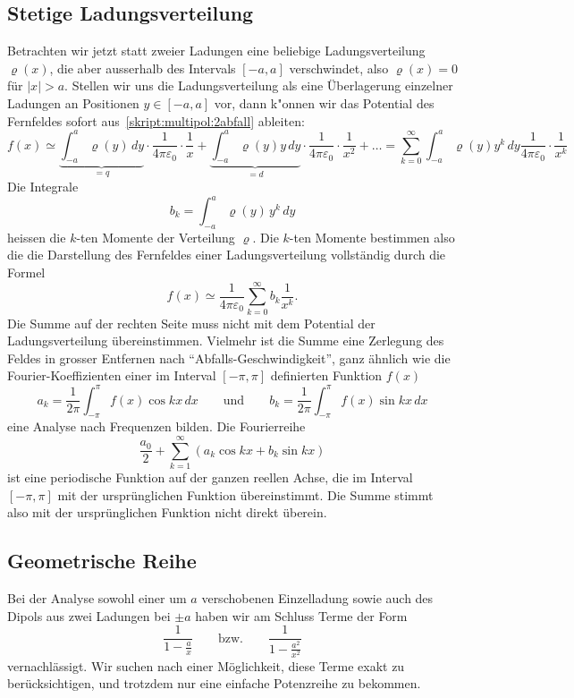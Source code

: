 \subsection{Stetige Ladungsverteilung%
\label{skript:multipol:section:stetigeladungsverteilung}}
Betrachten wir jetzt statt zweier Ladungen eine beliebige 
Ladungsverteilung $\varrho(x)$, die aber ausserhalb des Intervals
$[-a,a]$ verschwindet, also $\varrho(x)=0$ für $|x|>a$.
Stellen wir uns die Ladungsverteilung als eine Überlagerung einzelner
Ladungen an Positionen $y\in[-a,a]$ vor, dann k"onnen wir das
Potential des Fernfeldes sofort aus~\eqref{skript:multipol:2abfall}
ableiten:
\[
f(x)
\simeq
\underbrace{\int_{-a}^a \varrho(y)\,dy }_{\displaystyle =q}\cdot
\frac{1}{4\pi\varepsilon_0}\cdot\frac1x
+
\underbrace{\int_{-a}^a \varrho(y)y \,dy}_{\displaystyle =d}\cdot
\frac{1}{4\pi\varepsilon_0}\cdot\frac1{x^2}
+
\dots
=
\sum_{k=0}^\infty\int_{-a}^a\varrho(y)y^k\,dy\frac{1}{4\pi\varepsilon_0}\cdot\frac1{x^k} 
\]
Die Integrale 
\[
b_k=\int_{-a}^a \varrho(y)\,y^k\,dy
\]
heissen die $k$-ten Momente der Verteilung $\varrho$.
Die $k$-ten Momente bestimmen also die die Darstellung des Fernfeldes
einer Ladungsverteilung vollständig durch die Formel
\[
f(x)
\simeq
\frac1{4\pi\varepsilon_0}\sum_{k=0}^\infty b_k\frac{1}{x^k}.
\]
Die Summe auf der rechten Seite muss nicht mit dem Potential der
Ladungsverteilung übereinstimmen.
Vielmehr ist die Summe eine Zerlegung des Feldes in grosser Entfernen
nach ``Abfalls-Geschwindigkeit'',
ganz ähnlich wie die Fourier-Koeffizienten einer im Interval
$[-\pi,\pi]$ definierten Funktion $f(x)$
\[
a_k=\frac1{2\pi}\int_{-\pi}^\pi f(x)\cos kx\,dx
\qquad\text{und}\qquad
b_k=\frac1{2\pi}\int_{-\pi}^\pi f(x)\sin kx\,dx
\]
eine Analyse nach Frequenzen bilden.
Die Fourierreihe
\[
\frac{a_0}2+\sum_{k=1}^\infty (a_k\cos kx+b_k\sin kx)
\]
ist eine periodische Funktion auf der ganzen reellen Achse, die
im Interval $[-\pi,\pi]$ mit der ursprünglichen Funktion übereinstimmt.
Die Summe stimmt also mit der ursprünglichen Funktion nicht direkt
überein.

\subsection{Geometrische Reihe%
\label{skript:multipol:section:geometrischereihe}}
Bei der Analyse sowohl einer um $a$ verschobenen Einzelladung sowie auch
des Dipols aus zwei Ladungen bei $\pm a$ haben wir am Schluss Terme der
Form
\[
\frac1{1-\frac{a}{x}}
\qquad\text{bzw.}\qquad
\frac1{1-\frac{a^2}{x^2}}
\]
vernachlässigt.
Wir suchen nach einer Möglichkeit, diese Terme exakt zu berücksichtigen,
und trotzdem nur eine einfache Potenzreihe zu bekommen.

